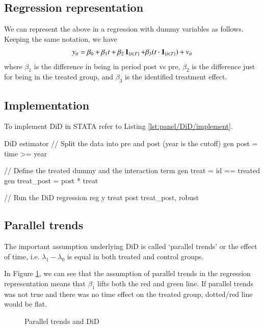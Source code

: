         \subsection{Regression representation}
            We can represent the above in a regression with dummy variables as follows. Keeping the same notation, we have
            \begin{align}
                y_{it} = \beta_0 +\beta_1 t + \beta_2 \ind_{i\in T} + \beta_{3}(t\cdot \ind_{i\in T}) + v_{it}
            \end{align}
            where $\beta_1$ is the difference in being in period post vs pre, $\beta_2$ is the difference just for being in the treated group, and $\beta_3$ is the identified treatment effect.

        \subsection{Implementation}
            To implement DiD in STATA refer to Listing \ref{lst:panel/DiD/implement}.
            \begin{sexylisting}[colback=white, label=lst:panel/DiD/implement]{DiD estimator}
//  Split the data into pre and post (year is the cutoff)
    gen post = time >= year

//  Define the treated dummy and the interaction term
    gen treat = id == treated
    gen treat_post = post * treat

//  Run the DiD regression
    reg y treat post treat_post, robust
            \end{sexylisting}

        \subsection{Parallel trends}
            The important assumption underlying DiD is called ‘parallel trends’ or the effect of time, i.e. $\lambda_1 - \lambda_0$ is equal in both treated and control groups.

            In Figure \ref{fig:panel/DiD/parallel_trend}, we can see that the assumption of parallel trends in the regression representation means that $\beta_1$ lifts both the red and green line. If parallel trends was not true and there was no time effect on the treated group, dotted/red line would be flat.

            \begin{figure}
                \centering
                
                \caption{Parallel trends and DiD}
                \label{fig:panel/DiD/parallel_trend}
            \end{figure}

